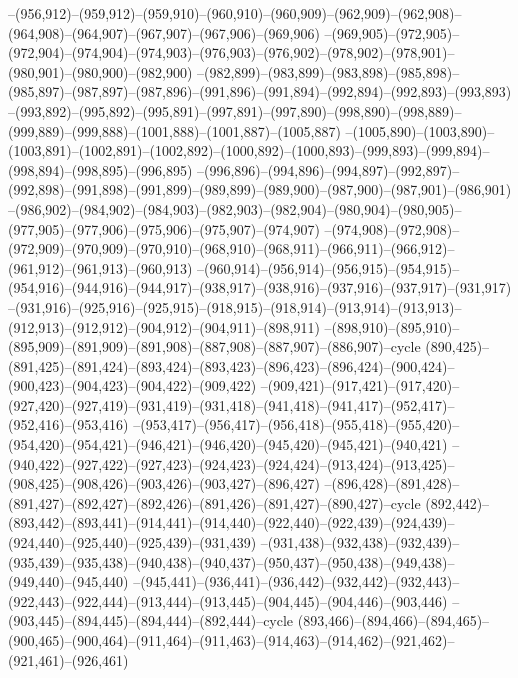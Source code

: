 --(956,912)--(959,912)--(959,910)--(960,910)--(960,909)--(962,909)--(962,908)--(964,908)--(964,907)--(967,907)--(967,906)--(969,906)
--(969,905)--(972,905)--(972,904)--(974,904)--(974,903)--(976,903)--(976,902)--(978,902)--(978,901)--(980,901)--(980,900)--(982,900)
--(982,899)--(983,899)--(983,898)--(985,898)--(985,897)--(987,897)--(987,896)--(991,896)--(991,894)--(992,894)--(992,893)--(993,893)
--(993,892)--(995,892)--(995,891)--(997,891)--(997,890)--(998,890)--(998,889)--(999,889)--(999,888)--(1001,888)--(1001,887)--(1005,887)
--(1005,890)--(1003,890)--(1003,891)--(1002,891)--(1002,892)--(1000,892)--(1000,893)--(999,893)--(999,894)--(998,894)--(998,895)--(996,895)
--(996,896)--(994,896)--(994,897)--(992,897)--(992,898)--(991,898)--(991,899)--(989,899)--(989,900)--(987,900)--(987,901)--(986,901)
--(986,902)--(984,902)--(984,903)--(982,903)--(982,904)--(980,904)--(980,905)--(977,905)--(977,906)--(975,906)--(975,907)--(974,907)
--(974,908)--(972,908)--(972,909)--(970,909)--(970,910)--(968,910)--(968,911)--(966,911)--(966,912)--(961,912)--(961,913)--(960,913)
--(960,914)--(956,914)--(956,915)--(954,915)--(954,916)--(944,916)--(944,917)--(938,917)--(938,916)--(937,916)--(937,917)--(931,917)
--(931,916)--(925,916)--(925,915)--(918,915)--(918,914)--(913,914)--(913,913)--(912,913)--(912,912)--(904,912)--(904,911)--(898,911)
--(898,910)--(895,910)--(895,909)--(891,909)--(891,908)--(887,908)--(887,907)--(886,907)--cycle
(890,425)--(891,425)--(891,424)--(893,424)--(893,423)--(896,423)--(896,424)--(900,424)--(900,423)--(904,423)--(904,422)--(909,422)
--(909,421)--(917,421)--(917,420)--(927,420)--(927,419)--(931,419)--(931,418)--(941,418)--(941,417)--(952,417)--(952,416)--(953,416)
--(953,417)--(956,417)--(956,418)--(955,418)--(955,420)--(954,420)--(954,421)--(946,421)--(946,420)--(945,420)--(945,421)--(940,421)
--(940,422)--(927,422)--(927,423)--(924,423)--(924,424)--(913,424)--(913,425)--(908,425)--(908,426)--(903,426)--(903,427)--(896,427)
--(896,428)--(891,428)--(891,427)--(892,427)--(892,426)--(891,426)--(891,427)--(890,427)--cycle
(892,442)--(893,442)--(893,441)--(914,441)--(914,440)--(922,440)--(922,439)--(924,439)--(924,440)--(925,440)--(925,439)--(931,439)
--(931,438)--(932,438)--(932,439)--(935,439)--(935,438)--(940,438)--(940,437)--(950,437)--(950,438)--(949,438)--(949,440)--(945,440)
--(945,441)--(936,441)--(936,442)--(932,442)--(932,443)--(922,443)--(922,444)--(913,444)--(913,445)--(904,445)--(904,446)--(903,446)
--(903,445)--(894,445)--(894,444)--(892,444)--cycle
(893,466)--(894,466)--(894,465)--(900,465)--(900,464)--(911,464)--(911,463)--(914,463)--(914,462)--(921,462)--(921,461)--(926,461)
